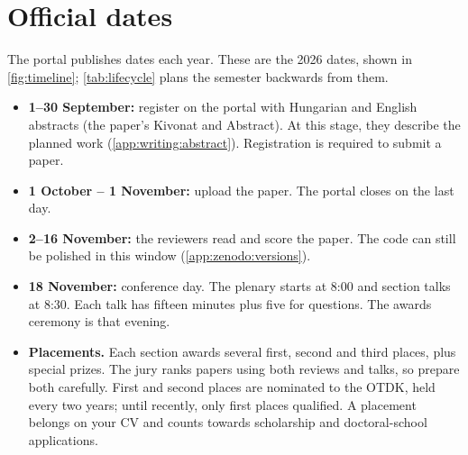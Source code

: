 \section{Official dates}\label{app:tdk:dates}
The portal publishes dates each year. These are the 2026 dates, shown in \cref{fig:timeline}; \cref{tab:lifecycle} plans the semester backwards from them.
\begin{itemize}
  \item \textbf{1--30 September:} register on the portal with Hungarian and English abstracts (the paper's Kivonat and Abstract). At this stage, they describe the planned work (\cref{app:writing:abstract}). Registration is required to submit a paper.
  \item \textbf{1 October -- 1 November:} upload the paper. The portal closes on the last day.
  \item \textbf{2--16 November:} the reviewers read and score the paper. The code can still be polished in this window (\cref{app:zenodo:versions}).
  \item \textbf{18 November:} conference day. The plenary starts at 8:00 and section talks at 8:30. Each talk has fifteen minutes plus five for questions. The awards ceremony is that evening.
  \item \textbf{Placements.} Each section awards several first, second and third places, plus special prizes. The jury ranks papers using both reviews and talks, so prepare both carefully. First and second places are nominated to the OTDK, held every two years; until recently, only first places qualified. A placement belongs on your CV and counts towards scholarship and doctoral-school applications.
\end{itemize}


